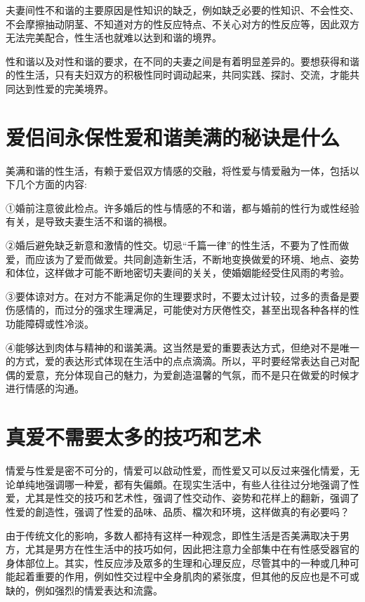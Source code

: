 \documentclass[12pt,UTF8]{ctexbook}
\begin{document}
夫妻间性不和谐的主要原因是性知识的缺乏，例如缺乏必要的性知识、不会性交、不会摩擦抽动阴茎、不知道对方的性反应特点、不关心对方的性反应等，因此双方无法完美配合，性生活也就难以达到和谐的境界。

性和谐以及对性和谐的要求，在不同的夫妻之间是有着明显差异的。要想获得和谐的性生活，只有夫妇双方的积极性同时调动起来，共同实践、探討、交流，才能共同达到性爱的完美境界。

\section{爱侣间永保性爱和谐美满的秘诀是什么}

美满和谐的性生活，有赖于爱侣双方情感的交融，将性爱与情爱融为一体，包括以下几个方面的内容:

①婚前注意彼此检点。许多婚后的性与情感的不和谐，都与婚前的性行为或性经验有关，是导致夫妻生活不和谐的禍根。

②婚后避免缺乏新意和激情的性交。切忌“千篇一律”的性生活，不要为了性而做爱，而应该为了爱而做爱。共同創造新生活，不断地变换做爱的环境、地点、姿势和体位，这样做才可能不断地密切夫妻间的关关，使婚姻能经受住风雨的考验。

③要体谅对方。在对方不能满足你的生理要求时，不要太过计较，过多的责备是要伤感情的，而过分的强求生理满足，可能使对方厌倦性交，甚至出现各种各样的性功能障碍或性冷淡。

④能够达到肉体与精神的和谐美满。这当然是爱的重要表达方式，但绝对不是唯一的方式，爱的表达形式体现在生活中的点点滴滴。所以，平时要经常表达自己对配偶的爱意，充分体现自己的魅力，为爱創造温馨的气氛，而不是只在做爱的时候才进行情感的沟通。

\section{真爱不需要太多的技巧和艺术}

情爱与性爱是密不可分的，情爱可以啟动性爱，而性爱又可以反过来强化情爱，无论单纯地强调哪一种爱，都有失偏頗。在现实生活中，有些人往往过分地强调了性爱，尤其是性交的技巧和艺术性，强调了性交动作、姿势和花样上的翻新，强调了性爱的創造性，强调了性爱的品味、品质、檔次和环境，这样做真的有必要吗？

由于传统文化的影响，多数人都持有这样一种观念，即性生活是否美满取决于男方，尤其是男方在性生活中的技巧如何，因此把注意力全部集中在有性感受器官的身体部位上。其实，性反应涉及眾多的生理和心理反应，尽管其中的一种或几种可能起着重要的作用，例如性交过程中全身肌肉的紧张度，但其他的反应也是不可或缺的，例如强烈的情爱表达和流露。
\end{document}
